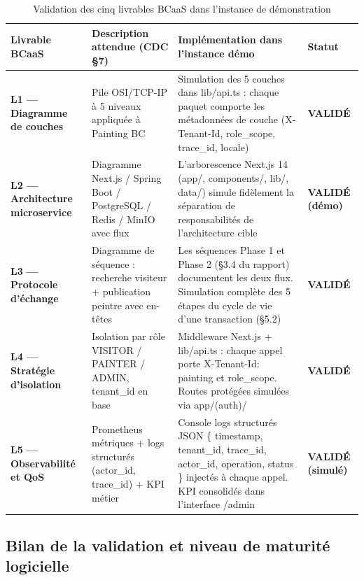 \documentclass[12pt,a4paper]{report}
\begin{document}
\begin{table}[H]
\centering
\caption{Validation des cinq livrables BCaaS dans l'instance de démonstration}
\label{tab:bcas_deliverables}
\renewcommand{\arraystretch}{1.4}
\small
\begin{tabular}{|p{}|p{}|p{}|p{}|}
\hline
\textbf{Livrable BCaaS} & \textbf{Description attendue (CDC §7)} & \textbf{Implémentation dans l'instance démo} & \textbf{Statut} \\
\hline
\textbf{L1 --- Diagramme de couches} & Pile OSI/TCP-IP à 5 niveaux appliquée à Painting BC & Simulation des 5 couches dans lib/api.ts : chaque paquet comporte les métadonnées de couche (X-Tenant-Id, role\_scope, trace\_id, locale) & \textbf{VALIDÉ} \\
\hline
\textbf{L2 --- Architecture microservice} & Diagramme Next.js / Spring Boot / PostgreSQL / Redis / MinIO avec flux & L'arborescence Next.js 14 (app/, components/, lib/, data/) simule fidèlement la séparation de responsabilités de l'architecture cible & \textbf{VALIDÉ (démo)} \\
\hline
\textbf{L3 --- Protocole d'échange} & Diagramme de séquence : recherche visiteur + publication peintre avec en-têtes & Les séquences Phase 1 et Phase 2 (§3.4 du rapport) documentent les deux flux. Simulation complète des 5 étapes du cycle de vie d'une transaction (§5.2) & \textbf{VALIDÉ} \\
\hline
\textbf{L4 --- Stratégie d'isolation} & Isolation par rôle VISITOR / PAINTER / ADMIN, tenant\_id en base & Middleware Next.js + lib/api.ts : chaque appel porte X-Tenant-Id: painting et role\_scope. Routes protégées simulées via app/(auth)/ & \textbf{VALIDÉ} \\
\hline
\textbf{L5 --- Observabilité et QoS} & Prometheus métriques + logs structurés (actor\_id, trace\_id) + KPI métier & Console logs structurés JSON \{ timestamp, tenant\_id, trace\_id, actor\_id, operation, status \} injectés à chaque appel. KPI consolidés dans l'interface /admin & \textbf{VALIDÉ (simulé)} \\
\hline
\end{tabular}
\end{table}

\subsection{Bilan de la validation et niveau de maturité logicielle}
\end{document}
